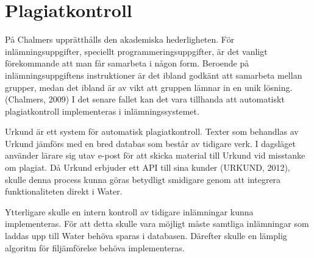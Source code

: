 \section{Plagiatkontroll}
På Chalmers upprätthålls den akademiska hederligheten. För inlämningsuppgifter, speciellt programmeringsuppgifter, är det vanligt förekommande att man får samarbeta i någon form. Beroende på inlämningsuppgiftens instruktioner är det ibland godkänt att samarbeta mellan grupper, medan det ibland är av vikt att gruppen lämnar in en unik lösning. (Chalmers, 2009) I det senare fallet kan det vara tillhanda att automatiskt plagiatkontroll implementeras i inlämningssystemet.

Urkund är ett system för automatisk plagiatkontroll. Texter som behandlas av Urkund jämförs med en bred databas som består av tidigare verk. I dagsläget använder lärare sig utav e-post för att skicka material till Urkund vid misstanke om plagiat. Då Urkund erbjuder ett API till sina kunder (URKUND, 2012), skulle denna process kunna göras betydligt smidigare genom att integrera funktionaliteten direkt i Water.

Ytterligare skulle en intern kontroll av tidigare inlämningar kunna implementeras. För att detta skulle vara möjligt måste samtliga inlämningar som laddas upp till Water behöva sparas i databasen. Därefter skulle en lämplig algoritm för filjämförelse behöva implementeras.
